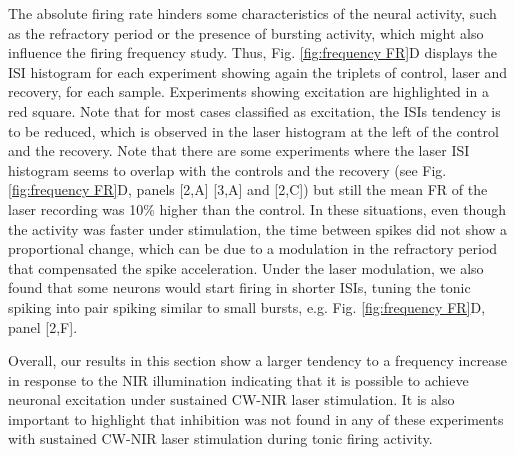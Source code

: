The absolute firing rate hinders some characteristics of the neural activity, such as the refractory period or the presence of bursting activity, which might also influence the firing frequency study. Thus, Fig. \ref{fig:frequency FR}D displays the ISI histogram for each experiment showing again the triplets of control, laser and recovery, for each sample. Experiments showing excitation are highlighted in a red square. Note that for most cases classified as excitation, the ISIs tendency is to be reduced, which is observed in the laser histogram at the left of the control and the recovery. Note that there are some experiments where the laser ISI histogram seems to overlap with the controls and the recovery (see Fig. \ref{fig:frequency FR}D, panels [2,A] [3,A] and [2,C]) but still the mean FR of the laser recording was 10\% higher than the control. In these situations, even though the activity was faster under stimulation, the time between spikes did not show a proportional change, which can be due to a modulation in the refractory period that compensated the spike acceleration. Under the laser modulation, we also found that some neurons would start firing in shorter ISIs, tuning the tonic spiking into pair spiking similar to small bursts, e.g. Fig. \ref{fig:frequency FR}D, panel [2,F].

Overall, our results in this section show a larger tendency to a frequency increase in response to the NIR illumination indicating that it is possible to achieve neuronal excitation under sustained CW-NIR laser stimulation. It is also important to highlight that inhibition was not found in any of these experiments with sustained CW-NIR laser stimulation during tonic firing activity. 


